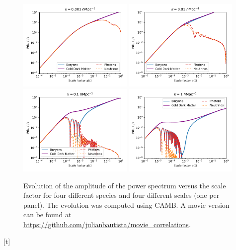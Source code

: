     \begin{figure}[t]
        \centering
        \includegraphics[width=0.49\textwidth]{fig/intro/pk_versus_time_k0.001.pdf}
        \includegraphics[width=0.49\textwidth]{fig/intro/pk_versus_time_k0.01.pdf}
        \includegraphics[width=0.49\textwidth]{fig/intro/pk_versus_time_k0.1.pdf}
        \includegraphics[width=0.49\textwidth]{fig/intro/pk_versus_time_k1.pdf}
        \caption{Evolution of the amplitude of the power spectrum versus the scale factor 
        for four different species and four different scales (one per panel). 
        The evolution was computed using \textsc{CAMB}. A movie version can be found 
        at \url{https://github.com/julianbautista/movie_correlations}.}
        \label{fig:pk_evolution}
    \end{figure}[t]


